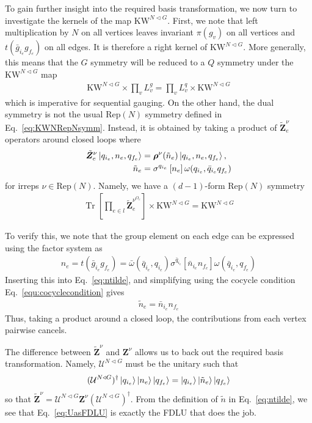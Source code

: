 \documentclass[nofootinbib,prx,twocolumn,showpacs,superscriptaddress,notitlepage,amsmath,amssymb]{revtex4-2}
\theoremstyle{definition}
\def\KW{\text{KW}}
\def\Rep{\text{Rep}}
\def\aut#1#2{\sigma^{#1} \left [ {#2} \right]}
\def\ket#1{\mathinner{|{#1}\rangle}}
\def\bs#1{\boldsymbol{#1}}
\DeclareMathOperator{\Tr}{Tr}
\begin{document}
To gain further insight into the required basis transformation, we now turn to investigate the  kernels of the map $\KW^{N \triangleleft G}$. First, we note that left multiplication by $N$ on all vertices leaves invariant $\pi(g_v)$ on all vertices and $t(\bar g_{i_e} g_{f_e})$ on all edges. It is therefore a right kernel of $\KW^{N\triangleleft G}$. More generally, this means that the $G$ symmetry will be reduced to a $Q$ symmetry under the $\KW^{N \triangleleft G}$ map
\begin{align}
    \KW^{N\triangleleft G} \times \prod_v L^g_v  = \prod_v L^q_v \times \KW^{N\triangleleft G} \label{eq:Q0form}
\end{align}
which is imperative for sequential gauging. On the other hand, the dual symmetry is not the usual $\Rep(N)$ symmetry defined in Eq.~\eqref{eq:KWNRepNsymm}. Instead, it is obtained by taking a product of $ \tilde  {\bs Z}^\nu_e$ operators around closed loops where
\begin{align}
    \tilde  {\bs Z}^\nu_e \ket{q_{i_e},n_e,q_{f_e}} &= \bs \rho^\nu(\tilde n_e) \ket{q_{i_e},n_e,q_{f_e}}, \label{eq:tildeZ}\\
      \tilde n_e &=  \aut{q_{i_e}}{n_e}\omega( q_{i_e}, \bar q_{i_e}q_{ f_e})
      \label{eq:ntilde}
\end{align}
for irreps $\nu \in \Rep(N)$. Namely, we have a $(d-1)$-form $\Rep(N)$ symmetry 
\begin{align}
      \Tr \left[\prod_{e \in l}   \tilde {\bs Z}^{\nu^{O_e}}_e \right] \times \KW^{N\triangleleft G} = \KW^{N\triangleleft G}
    \label{eq:repNd-1form} 
\end{align}

To verify this, we note that the group element on each edge can be expressed using the factor system as
\begin{align}
  n_e =   t(\bar g_{i_e}g_{f_e}) = \bar \omega(\bar q_{i_e},q_{i_e}) \aut{\bar q_{i_e}}{\bar n_{i_e} n_{f_e}}  \omega(\bar q_{i_e},q_{f_e})
    \label{eq:tgigfbar}
\end{align}
Inserting this into Eq.~\eqref{eq:ntilde}, and simplifying using the cocycle condition Eq.~\eqref{equ:cocyclecondition} gives
\begin{align}
  \tilde n_e = \bar n_{i_e}n_{f_e}
\end{align}
 Thus, taking a product around a closed loop, the contributions from each vertex pairwise cancels.






The difference between $\tilde{\bs Z}^\nu$ and $\bs Z^\nu$ allows us to back out the required basis transformation. Namely, $\mathcal U^{N \triangleleft G}$ must be the unitary such that
\begin{align}
   (\mathcal U^{N \triangleleft G})^\dagger \ket{q_{i_e}} \ket{n_e} \ket{q_{f_e}} = \ket{q_{i_e}} \ket{\tilde n_e} \ket{q_{f_e}}
\end{align}
so that $\tilde{\bs Z}^\nu = \mathcal U^{N \triangleleft G} \bs Z^\nu(\mathcal U^{N \triangleleft G})^\dagger$. From the definition of $\tilde n$ in Eq.~\eqref{eq:ntilde}, we see that Eq.~\eqref{eq:UasFDLU} is exactly the FDLU that does the job.
\end{document}
